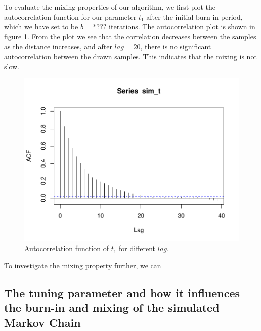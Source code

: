 

To evaluate the mixing properties of our algorithm, we first plot the autocorrelation function for our parameter $t_1$ after the initial burn-in period, which we have set to be $b = *???$ iterations. The autocorrelation plot is shown in figure \ref{fig:acf_t}. From the plot we see that the correlation decreases between the samples as the distance increases, and after $lag = 20$, there is no significant autocorrelation between the drawn samples. This indicates that the mixing is not slow. 

\begin{figure}[h]
    \centering
    \includegraphics{Images/acf_t_10000.pdf}
    \caption{Autocorrelation function of $t_1$ for different $lag$. }
    \label{fig:acf_t}
\end{figure}

To investigate the mixing property further, we can 

\subsection{The tuning parameter and how it influences the burn-in and mixing of the simulated Markov Chain}

